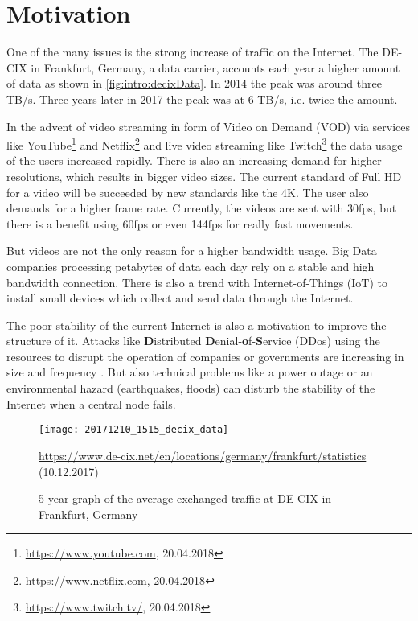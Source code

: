 \documentclass[thesis.tex]{subfiles}
\begin{document}
\section{Motivation}
One of the many issues is the strong increase of traffic on the Internet. The DE-CIX in Frankfurt, Germany, a data carrier, accounts each year a higher amount of data as shown in \autoref{fig:intro:decixData}. In 2014 the peak was around three TB/s. Three years later in 2017 the peak was at 6 TB/s, i.e. twice the amount. 

In the advent of video streaming in form of Video on Demand (VOD) via services like YouTube\footnote{\url{https://www.youtube.com}, 20.04.2018} and Netflix\footnote{\url{https://www.netflix.com}, 20.04.2018} and live video streaming like Twitch\footnote{\url{https://www.twitch.tv/}, 20.04.2018} the data usage of the users increased rapidly. There is also an increasing demand for higher resolutions, which results in bigger video sizes. The current standard of Full HD for a video will be succeeded by new standards like the 4K. The user also demands for a higher frame rate. Currently, the videos are sent with 30fps, but there is a benefit using 60fps or even 144fps for really fast movements.

But videos are not the only reason for a higher bandwidth usage. Big Data companies processing petabytes of data each day rely on a stable and high bandwidth connection. There is also a trend with Internet-of-Things (IoT) to install small devices which collect and send data through the Internet.

The poor stability of the current Internet is also a motivation to improve the structure of it. Attacks like \textbf{D}istributed \textbf{D}enial-\textbf{o}f-\textbf{S}ervice (DDos) using the resources to disrupt the operation of companies or governments are increasing in size and frequency \cite{GoogleInc.2013}. But also technical problems like a power outage \cite{DECIX.10.04.2018} or an environmental hazard (earthquakes, floods) can disturb the stability of the Internet when a central node fails. 

\begin{figure}
    \centering
    \texttt{[image: 20171210\_1515\_decix\_data]}
    \caption*{\tiny{ \url{https://www.de-cix.net/en/locations/germany/frankfurt/statistics} (10.12.2017)}}
    \caption{5-year graph of the average exchanged traffic at DE-CIX in Frankfurt, Germany}
    \label{fig:intro:decixData}
\end{figure}
\end{document}
